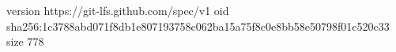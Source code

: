 version https://git-lfs.github.com/spec/v1
oid sha256:1c3788abd071f8db1e807193758c062ba15a75f8c0e8bb58e50798f01c520c33
size 778
